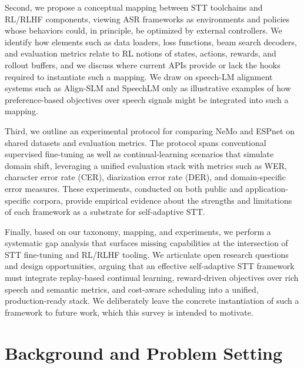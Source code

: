 \documentclass[conference]{IEEEtran}
\begin{document}
Second, we propose a conceptual mapping between STT toolchains and RL/RLHF components, viewing ASR frameworks as environments and policies whose behaviors could, in principle, be optimized by external controllers. We identify how elements such as data loaders, loss functions, beam search decoders, and evaluation metrics relate to RL notions of states, actions, rewards, and rollout buffers, and we discuss where current APIs provide or lack the hooks required to instantiate such a mapping. We draw on speech-LM alignment systems such as Align-SLM and SpeechLM only as illustrative examples of how preference-based objectives over speech signals might be integrated into such a mapping.

Third, we outline an experimental protocol for comparing NeMo and ESPnet on shared datasets and evaluation metrics. The protocol spans conventional supervised fine-tuning as well as continual-learning scenarios that simulate domain shift, leveraging a unified evaluation stack with metrics such as WER, character error rate (CER), diarization error rate (DER), and domain-specific error measures. These experiments, conducted on both public and application-specific corpora, provide empirical evidence about the strengths and limitations of each framework as a substrate for self-adaptive STT.

Finally, based on our taxonomy, mapping, and experiments, we perform a systematic gap analysis that surfaces missing capabilities at the intersection of STT fine-tuning and RL/RLHF tooling. We articulate open research questions and design opportunities, arguing that an effective self-adaptive STT framework must integrate replay-based continual learning, reward-driven objectives over rich speech and semantic metrics, and cost-aware scheduling into a unified, production-ready stack. We deliberately leave the concrete instantiation of such a framework to future work, which this survey is intended to motivate.

\section{Background and Problem Setting}

\end{document}
